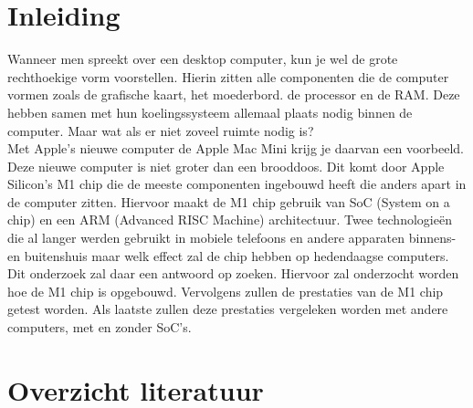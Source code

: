 \documentclass{hogent-article}
\affiliation{
    \textsuperscript{1} \href{mailto:jona.deneve.@student.hogent.be}{jona.deneve.@student.hogent.be}
}
\begin{document}
\flushbottom %
\maketitle %
    \tableofcontents %
\thispagestyle{empty} %


\section{Inleiding}


Wanneer men spreekt over een desktop computer, kun je wel de grote rechthoekige vorm voorstellen. Hierin zitten alle componenten die de computer vormen zoals de grafische kaart, het moederbord. de processor en de RAM. Deze hebben samen met hun koelingssysteem allemaal plaats nodig binnen de computer. Maar wat als er niet zoveel ruimte nodig is? \\
Met Apple's nieuwe computer de Apple Mac Mini krijg je daarvan een voorbeeld. Deze nieuwe computer is niet groter dan een brooddoos. Dit komt door Apple Silicon's M1 chip die de meeste componenten ingebouwd heeft die anders apart in de computer zitten. Hiervoor maakt de M1 chip gebruik van SoC (System on a chip) en een ARM (Advanced RISC Machine) architectuur. Twee technologieën die al langer werden gebruikt in mobiele telefoons en andere apparaten binnens- en buitenshuis maar welk effect zal de chip hebben op hedendaagse computers. Dit onderzoek zal daar een antwoord op zoeken. Hiervoor zal onderzocht worden hoe de M1 chip is opgebouwd. Vervolgens zullen de prestaties van de M1 chip getest worden. Als laatste zullen deze prestaties vergeleken worden met andere computers, met en zonder SoC's.

\section{Overzicht literatuur}
\end{document}

